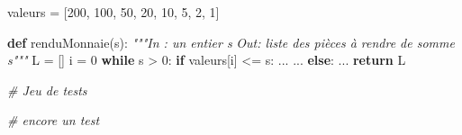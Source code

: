\documentclass[
  paper=a4,
  ,captions=tableheading
]{scrartcl}
\newenvironment{Shaded}{}{}
\newcommand{\CommentTok}[1]{\textcolor[rgb]{0.38,0.63,0.69}{\textit{#1}}}
\newcommand{\ControlFlowTok}[1]{\textcolor[rgb]{0.00,0.44,0.13}{\textbf{#1}}}
\newcommand{\DecValTok}[1]{\textcolor[rgb]{0.25,0.63,0.44}{#1}}
\newcommand{\KeywordTok}[1]{\textcolor[rgb]{0.00,0.44,0.13}{\textbf{#1}}}
\newcommand{\NormalTok}[1]{#1}
\newcommand{\OperatorTok}[1]{\textcolor[rgb]{0.40,0.40,0.40}{#1}}
\begin{document}
\begin{Shaded}
\begin{Highlighting}[]
\NormalTok{valeurs }\OperatorTok{=}\NormalTok{ [}\DecValTok{200}\NormalTok{, }\DecValTok{100}\NormalTok{, }\DecValTok{50}\NormalTok{, }\DecValTok{20}\NormalTok{, }\DecValTok{10}\NormalTok{, }\DecValTok{5}\NormalTok{, }\DecValTok{2}\NormalTok{, }\DecValTok{1}\NormalTok{]}


\KeywordTok{def}\NormalTok{ renduMonnaie(s):}
    \CommentTok{"""In : un entier s}
\CommentTok{    Out: liste des pièces à rendre de somme s"""}
\NormalTok{    L }\OperatorTok{=}\NormalTok{ []}
\NormalTok{    i }\OperatorTok{=} \DecValTok{0}
    \ControlFlowTok{while}\NormalTok{ s }\OperatorTok{\textgreater{}} \DecValTok{0}\NormalTok{:}
        \ControlFlowTok{if}\NormalTok{ valeurs[i] }\OperatorTok{\textless{}=}\NormalTok{ s:}
\NormalTok{            ...}
\NormalTok{            ...}
        \ControlFlowTok{else}\NormalTok{:}
\NormalTok{            ...}
    \ControlFlowTok{return}\NormalTok{ L}
\end{Highlighting}
\end{Shaded}

\begin{Shaded}
\begin{Highlighting}[]
\CommentTok{\# Jeu de tests}
\end{Highlighting}
\end{Shaded}

\begin{Shaded}
\begin{Highlighting}[]
\CommentTok{\# encore un test}
\end{Highlighting}
\end{Shaded}
\end{document}
